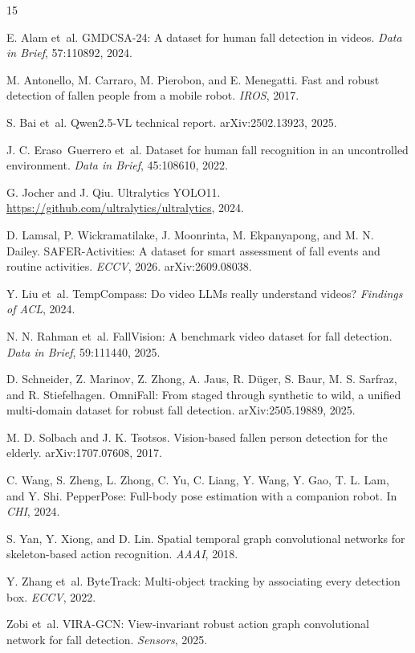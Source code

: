\small
\begin{thebibliography}{15}

E. Alam et~al.
GMDCSA-24: A dataset for human fall detection in videos.
\emph{Data in Brief}, 57:110892, 2024.

M. Antonello, M. Carraro, M. Pierobon, and E. Menegatti.
Fast and robust detection of fallen people from a mobile robot.
\emph{IROS}, 2017.

S. Bai et~al.
Qwen2.5-VL technical report.
arXiv:2502.13923, 2025.

J. C. Eraso~Guerrero et~al.
Dataset for human fall recognition in an uncontrolled environment.
\emph{Data in Brief}, 45:108610, 2022.

G. Jocher and J. Qiu.
Ultralytics YOLO11.
\url{https://github.com/ultralytics/ultralytics}, 2024.

D. Lamsal, P. Wickramatilake, J. Moonrinta, M. Ekpanyapong, and M. N. Dailey.
SAFER-Activities: A dataset for smart assessment of fall events and routine activities.
\emph{ECCV}, 2026. arXiv:2609.08038.

Y. Liu et~al.
TempCompass: Do video LLMs really understand videos?
\emph{Findings of ACL}, 2024.

N. N. Rahman et~al.
FallVision: A benchmark video dataset for fall detection.
\emph{Data in Brief}, 59:111440, 2025.

D. Schneider, Z. Marinov, Z. Zhong, A. Jaus, R. D{\"u}ger, S. Baur, M. S. Sarfraz, and R. Stiefelhagen.
OmniFall: From staged through synthetic to wild, a unified multi-domain dataset for robust fall detection.
arXiv:2505.19889, 2025.

M. D. Solbach and J. K. Tsotsos.
Vision-based fallen person detection for the elderly.
arXiv:1707.07608, 2017.

C. Wang, S. Zheng, L. Zhong, C. Yu, C. Liang, Y. Wang, Y. Gao, T. L. Lam, and Y. Shi.
PepperPose: Full-body pose estimation with a companion robot.
In \emph{CHI}, 2024.

S. Yan, Y. Xiong, and D. Lin.
Spatial temporal graph convolutional networks for skeleton-based action recognition.
\emph{AAAI}, 2018.

Y. Zhang et~al.
ByteTrack: Multi-object tracking by associating every detection box.
\emph{ECCV}, 2022.

Zobi et~al.
VIRA-GCN: View-invariant robust action graph convolutional network for fall detection.
\emph{Sensors}, 2025.

\end{thebibliography}


